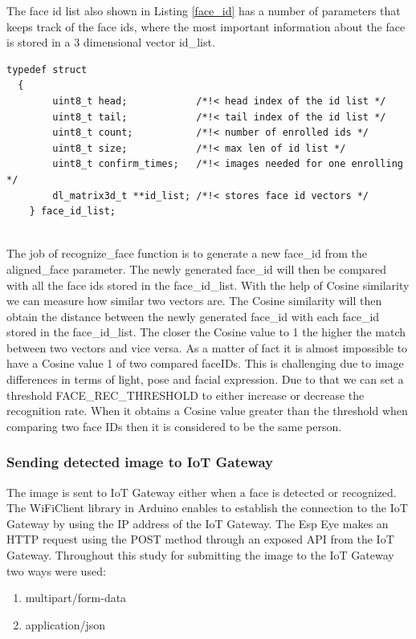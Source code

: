 The face id list also shown in Listing \ref{face_id} has a number of parameters that keeps track of the face ids, where the most important information about the face is stored in a 3 dimensional vector {\selectfont id\_list}. 





\begin{lstlisting}[caption={Face Id List},label=face_id, captionpos=b]
typedef struct
  {
        uint8_t head;            /*!< head index of the id list */
        uint8_t tail;            /*!< tail index of the id list */
        uint8_t count;           /*!< number of enrolled ids */
        uint8_t size;            /*!< max len of id list */
        uint8_t confirm_times;   /*!< images needed for one enrolling */
        dl_matrix3d_t **id_list; /*!< stores face id vectors */
    } face_id_list;
    
    \end{lstlisting}

The job of {\selectfont recognize\_face} function is to generate a new {\selectfont face\_id} from the {\selectfont aligned\_face} parameter. The newly generated {\selectfont face\_id} will then be compared with all the face ids stored in the {\selectfont face\_id\_list}. With the help of Cosine similarity we can measure how similar two vectors are. The Cosine similarity will then obtain the distance between the newly generated {\selectfont face\_id} with each {\selectfont face\_id} stored in the {\selectfont face\_id\_list}. The closer the Cosine value to 1 the higher the match between two vectors and vice versa. As a matter of fact it is almost impossible to have a Cosine value 1 of two compared faceIDs. This is challenging due to image differences in terms of light, pose and facial expression. Due to that we can set a threshold {\selectfont FACE\_REC\_THRESHOLD}  to either increase or decrease the recognition rate. When it obtains a Cosine value greater than the threshold when comparing two face IDs then it is considered to be the same person. 

\subsubsection{Sending detected image to IoT Gateway} 

The image is sent to IoT Gateway either when a face is detected or recognized. The WiFiClient library in Arduino enables to establish the connection to the IoT Gateway by using the IP address of the IoT Gateway. The Esp Eye makes an HTTP request using the POST method through an exposed API from the IoT Gateway. Throughout this study for submitting the image to the IoT Gateway two ways were used: 
\begin{enumerate}
    \item multipart/form-data
    \item application/json
\end{enumerate}

